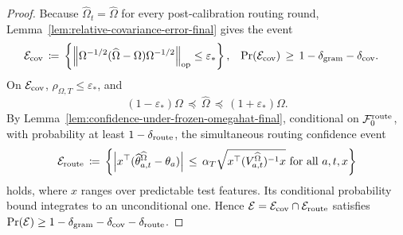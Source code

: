 \documentclass{article} %
\begin{document}
\begin{proof}
Because \(\widehat\Omega_t=\widehat\Omega\) for every post-calibration routing
round, Lemma~\ref{lem:relative-covariance-error-final} gives the event
\begin{equation}
\begin{aligned}
\mathcal{E}_{\rm cov}
&\,\coloneqq\,
\left\{
\left\|
\Omega^{-1/2}(\widehat\Omega-\Omega)\Omega^{-1/2}
\right\|_{\mathrm{op}}
\leq\varepsilon_*
\right\},
&
\Pr(\mathcal E_{\rm cov})
&\,\geq\,
1-\delta_{\rm gram}-\delta_{\rm cov}.
\end{aligned}
\end{equation}
On \(\mathcal E_{\rm cov}\), \(\rho_{\Omega,T}\leq\varepsilon_*\), and
\begin{equation}
(1-\varepsilon_*)\Omega
\,\preceq\,
\widehat\Omega
\,\preceq\,
(1+\varepsilon_*)\Omega.
\end{equation}
By Lemma~\ref{lem:confidence-under-frozen-omegahat-final}, conditional on
\(\mathcal F_0^{\rm route}\), with probability at least
\(1-\delta_{\rm route}\), the simultaneous routing confidence event
\begin{equation}
\mathcal E_{\rm route}
\,\coloneqq\,
\left\{
\left|
x^\top(\widehat\theta_{a,t}^{\widehat\Omega}-\theta_a)
\right|
\,\leq\,
\alpha_T
\sqrt{x^\top(V_{a,t}^{\widehat\Omega})^{-1}x}
\ \text{for all \(a,t,x\)}
\right\}
\end{equation}
holds, where \(x\) ranges over predictable test features. Its conditional
probability bound integrates to an unconditional one. Hence
\(\mathcal E=\mathcal E_{\rm cov}\cap\mathcal E_{\rm route}\) satisfies
\(\Pr(\mathcal E)\geq
1-\delta_{\rm gram}-\delta_{\rm cov}-\delta_{\rm route}\).


\end{proof}
\end{document}
